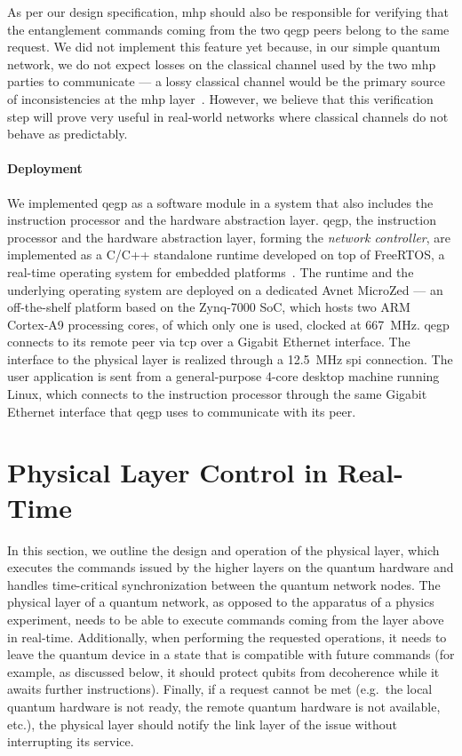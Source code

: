 As per our design specification, \acrshort{mhp} should also be responsible for verifying that the
entanglement commands coming from the two \acrshort{qegp} peers belong to the same request. We did
not implement this feature yet because, in our simple quantum network, we do not expect losses on
the classical channel used by the two \acrshort{mhp} parties to communicate --- a lossy classical
channel would be the primary source of inconsistencies at the \acrshort{mhp}
layer~\cite{dahlberg_2019_egp}. However, we believe that this verification step will prove very
useful in real-world networks where classical channels do not behave as predictably.

\paragraph{Deployment}

We implemented \acrshort{qegp} as a software module in a system that also includes the instruction
processor and the hardware abstraction layer. \acrshort{qegp}, the instruction processor and the
hardware abstraction layer, forming the \emph{network controller}, are implemented as a C/C++
standalone runtime developed on top of FreeRTOS, a real-time operating system for embedded
platforms~\cite{freertos}. The runtime and the underlying operating system are deployed on a
dedicated Avnet MicroZed --- an off-the-shelf platform based on the Zynq-7000 SoC, which hosts two
ARM Cortex-A9 processing cores, of which only one is used, clocked at \qty{667}{\MHz}.
\acrshort{qegp} connects to its remote peer via \acrshort{tcp} over a Gigabit Ethernet interface.
The interface to the physical layer is realized through a \qty{12.5}{\MHz} \acrshort{spi}
connection. The user application is sent from a general-purpose 4-core desktop machine running
Linux, which connects to the instruction processor through the same Gigabit Ethernet interface that
\acrshort{qegp} uses to communicate with its peer.

\section{Physical Layer Control in Real-Time}
\label{sec:netstack:phys}

In this section, we outline the design and operation of the physical layer, which executes the
commands issued by the higher layers on the quantum hardware and handles time-critical
synchronization between the quantum network nodes. The physical layer of a quantum network, as
opposed to the apparatus of a physics experiment, needs to be able to execute commands coming from
the layer above in real-time. Additionally, when performing the requested operations, it needs to
leave the quantum device in a state that is compatible with future commands (for example, as
discussed below, it should protect qubits from decoherence while it awaits further instructions).
Finally, if a request cannot be met (e.g.~the local quantum hardware is not ready, the remote
quantum hardware is not available, etc.), the physical layer should notify the link layer of the
issue without interrupting its service.

